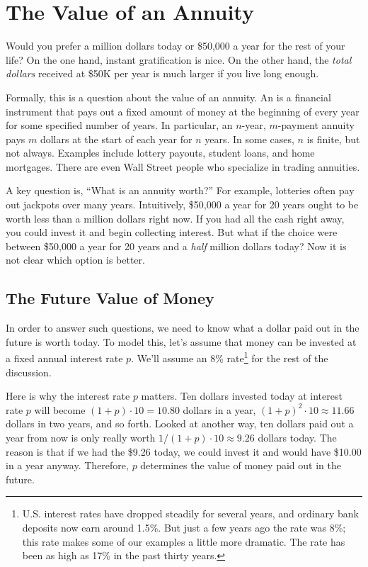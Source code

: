 \section{The Value of an Annuity}\label{annuity_sec}

Would you prefer a million dollars today or \$50,000 a year for the
rest of your life?  On the one hand, instant gratification is nice.
On the other hand, the \emph{total dollars} received at \$50K per year
is much larger if you live long enough.

Formally, this is a question about the value of an annuity.  An
 is a financial instrument that pays out a fixed amount of
money at the beginning of every year for some specified number of years.
In particular, an $n$-year, $m$-payment annuity pays $m$ dollars at the
start of each year for $n$ years.  In some cases, $n$ is finite, but not
always.  Examples include lottery payouts, student loans, and home
mortgages.  There are even Wall Street people who specialize in trading
annuities.

A key question is, ``What is an annuity worth?''  For example,
lotteries often pay out jackpots over many years.  Intuitively,
\$50,000 a year for 20 years ought to be worth less than a million
dollars right now.  If you had all the cash right away, you could
invest it and begin collecting interest.  But what if the choice were
between \$50,000 a year for 20 years and a \emph{half} million
dollars today?  Now it is not clear which option is better.

\subsection{The Future Value of Money}

In order to answer such questions, we need to know what a dollar paid out
in the future is worth today.  To model this, let's assume that money can
be invested at a fixed annual interest rate $p$.  We'll assume an 8\%
rate\footnote{U.S. interest rates have dropped steadily for several years,
  and ordinary bank deposits now earn around 1.5\%.  But just a few years
  ago the rate was 8\%; this rate makes some of our examples a little more
  dramatic.  The rate has been as high as 17\% in the past thirty
  years.}  for
the rest of the discussion.

Here is why the interest rate $p$ matters.  Ten dollars invested today
at interest rate $p$ will become $(1+p)\cdot 10 = 10.80$ dollars in a
year, $(1+p)^2\cdot 10 \approx 11.66$ dollars in two years, and so
forth.  Looked at another way, ten dollars paid out a year from now is
only really worth $1/(1+p) \cdot 10 \approx 9.26$ dollars today.  The
reason is that if we had the \$9.26 today, we could invest it and
would have \$10.00 in a year anyway.  Therefore, $p$ determines the
value of money paid out in the future.

